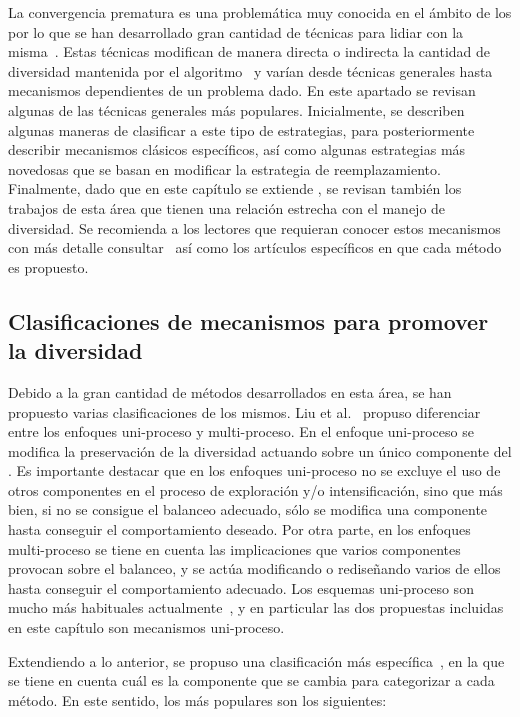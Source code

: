 La convergencia prematura es una problemática muy conocida en el ámbito de los \EAS{} por lo que se han desarrollado gran cantidad de técnicas 
para lidiar con la misma~\cite{pandey2014comparative}.
%
Estas técnicas modifican de manera directa o indirecta la cantidad de diversidad mantenida por el algoritmo~\cite{Joel:Crepinsek}
y varían desde técnicas generales hasta mecanismos dependientes de un problema dado.
%
En este apartado se revisan algunas de las técnicas generales más populares.
%
Inicialmente, se describen algunas maneras de clasificar a este tipo de estrategias, para posteriormente
describir mecanismos clásicos específicos, así como algunas estrategias más novedosas que se basan en modificar
la estrategia de reemplazamiento.
%
Finalmente, dado que en este capítulo se extiende \DE{}, se revisan también los trabajos de esta área que tienen una relación
estrecha con el manejo de diversidad.
%
Se recomienda a los lectores que requieran conocer estos mecanismos con más detalle consultar~\cite{Joel:Crepinsek} así como los artículos
específicos en que cada método es propuesto.

\subsection{Clasificaciones de mecanismos para promover la diversidad}

Debido a la gran cantidad de métodos desarrollados en esta área, se han propuesto varias clasificaciones de los mismos.
%
Liu et al.~\cite{liu2009explore} propuso diferenciar entre los enfoques uni-proceso y multi-proceso.
%
En el enfoque uni-proceso se modifica la preservación de la diversidad actuando sobre un único componente del \EA{}. 
%
Es importante destacar que en los enfoques uni-proceso no se excluye el uso de otros componentes en el proceso de exploración y/o intensificación, 
sino que más bien, si no se consigue el balanceo adecuado, sólo se modifica una componente hasta conseguir el comportamiento deseado.
%
Por otra parte, en los enfoques multi-proceso se tiene en cuenta las implicaciones que varios componentes 
provocan sobre el balanceo, y se actúa modificando o rediseñando varios de ellos
hasta conseguir el comportamiento adecuado.
%
Los esquemas uni-proceso son mucho más habituales actualmente~\cite{Crepinsek:13}, y en particular las dos propuestas incluidas en este capítulo son mecanismos
uni-proceso.

Extendiendo a lo anterior, se propuso una clasificación más específica~\cite{Crepinsek:13}, en la que se tiene en cuenta cuál es la componente 
que se cambia para categorizar a cada método.
%
En este sentido, los más populares son los siguientes:

